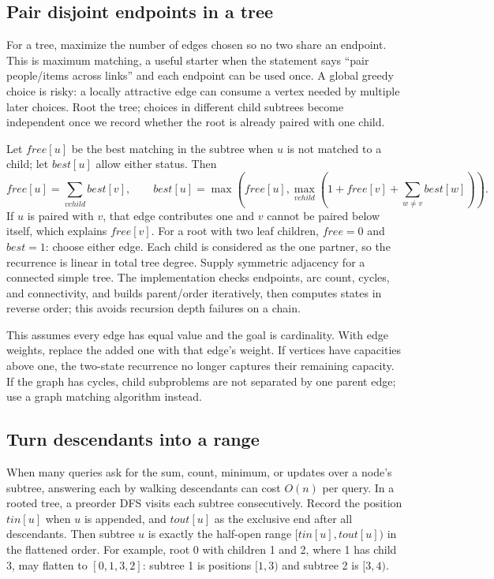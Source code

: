 \subsection{Pair disjoint endpoints in a tree}
For a tree, maximize the number of edges chosen so no two share an endpoint.
This is maximum matching, a useful starter when the statement says
``pair people/items across links'' and each endpoint can be used once. A
global greedy choice is risky: a locally attractive edge can consume a
vertex needed by multiple later choices. Root the tree; choices in
different child subtrees become independent once we record whether the
root is already paired with one child.

Let $free[u]$ be the best matching in the subtree when $u$ is not matched
to a child; let $best[u]$ allow either status. Then
\[
 free[u]=\sum_{v child}best[v],\qquad
 best[u]=\max\left(free[u],\max_{v child}
   \left(1+free[v]+\sum_{w\ne v}best[w]\right)\right).
\]
If $u$ is paired with $v$, that edge contributes one and $v$ cannot be
paired below itself, which explains $free[v]$. For a root with two leaf
children, $free=0$ and $best=1$: choose either edge. Each child is
considered as the one partner, so the recurrence is linear in total tree
degree. Supply symmetric adjacency for a connected simple tree. The implementation checks
endpoints, arc count, cycles, and connectivity, and
builds parent/order iteratively, then computes states in reverse order;
this avoids recursion depth failures on a chain.

This assumes every edge has equal value and the goal is cardinality. With
edge weights, replace the added one with that edge's weight. If vertices
have capacities above one, the two-state recurrence no longer captures
their remaining capacity. If the graph has cycles, child subproblems are
not separated by one parent edge; use a graph matching algorithm instead.

\subsection{Turn descendants into a range}
When many queries ask for the sum, count, minimum, or updates over a node's
subtree, answering each by walking descendants can cost $O(n)$ per query.
In a rooted tree, a preorder DFS visits each subtree consecutively. Record
the position $tin[u]$ when $u$ is appended, and $tout[u]$ as the exclusive
end after all descendants. Then subtree $u$ is exactly the half-open range
$[tin[u],tout[u])$ in the flattened order. For example, root 0 with
children 1 and 2, where 1 has child 3, may flatten to $[0,1,3,2]$:
subtree 1 is positions $[1,3)$ and subtree 2 is $[3,4)$.

